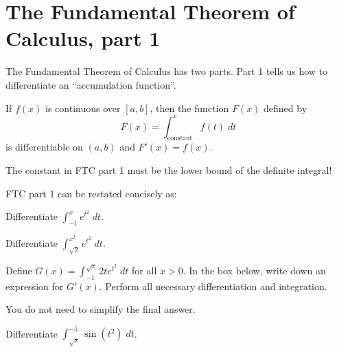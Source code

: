 \documentclass[../main.tex]{subfiles}
\begin{document}
\section{The Fundamental Theorem of Calculus, part 1}
The Fundamental Theorem of Calculus has two parts. Part 1 tells us how to differentiate an \enquote{accumulation function}.

\begin{thm} \label{thm:ftc-part-one}
  If \(f(x)\) is continuous over \([a,b]\), then the function \(F(x)\) defined by
  \[
    F(x) = \int_{\text{constant}}^{x} f(t) \;dt
  \]
  is differentiable on \((a,b)\) and \(F'(x) = f(x)\).

\end{thm}
\faExclamationTriangle{} The constant in FTC part 1 must be the lower bound of the definite integral!

FTC part 1 can be restated concisely as:


\begin{example}
  Differentiate \(\int_{-1}^{x} e^{t^{2}} \;dt\).

  \blanks*
\end{example}

\begin{example}
  Differentiate \(\int_{\sqrt{2}}^{x^{2}} e^{t^{2}} \;dt\).

  \blanks*
\end{example}
\clearpage

\begin{exercise}
  Define \(G(x) = \int_{-1}^{\sqrt{x}} 2t e^{t^{2}} \;dt\) for all \(x > 0\).  In the box below, write down an expression for \(G'(x)\). Perform all necessary differentiation and integration.

  You do not need to simplify the final answer.


  \blanks*
\end{exercise}

\begin{exercise}
  Differentiate \(\int_{\sqrt{x}}^{-5} \sin(t^{2}) \;dt\).

  \blanks*
\end{exercise}
\clearpage
\end{document}
